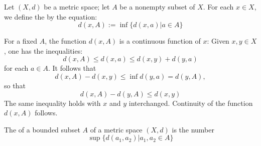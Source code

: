 \documentclass[12pt, a4paper, oneside, openright, titlepage]{book}
\begin{document}
\begin{definition}
    Let $(X,d)$ be a metric space; let $A$ be a nonempty subset of $X$. For each $x \in X$, we define the  by the equation: \begin{equation*}
        d(x,A) := \inf\{d(x,a)\vert a \in A\}
    \end{equation*}
\end{definition}

For a fixed $A$, the function $d(x,A)$ is a continuous function of $x$: Given $x,y \in X$, one has the inequalities: \begin{equation*}
    d(x,A) \leq d(x,a) \leq d(x,y)+d(y,a)
\end{equation*}
for each $a \in A$. It follows that \begin{equation*}
    d(x,A) - d(x,y) \leq \inf d(y,a) = d(y,A),
\end{equation*}
so that \begin{equation*}
    d(x,A) - d(y,A) \leq d(x,y)
\end{equation*}
The same inequality holds with $x$ and $y$ interchanged. Continuity of the function $d(x,A)$ follows.

\begin{definition}
    The  of a bounded subset $A$ of a metric space $(X,d)$ is the number \begin{equation*}
        \sup\{d(a_1,a_2)\vert a_1,a_2 \in A\}
    \end{equation*}
\end{definition}
\end{document}
